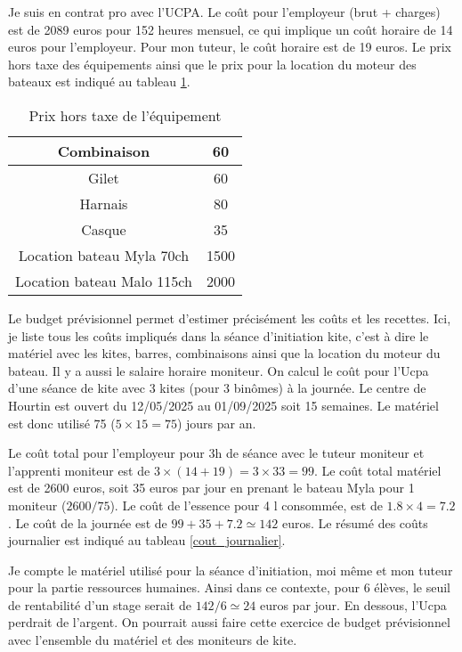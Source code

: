 \documentclass[11pt,a4paper]{report}
\begin{document}
Je suis en contrat pro avec l'UCPA. Le coût pour l'employeur (brut + charges) est
de 2089 euros pour 152 heures mensuel, 
ce qui implique un coût horaire de 14 euros pour l'employeur.
Pour mon tuteur, le coût horaire est de 19 euros.
Le prix hors taxe des équipements ainsi
que le prix pour la location du moteur des bateaux est indiqué
au tableau \ref{cout_equipement}.


\begin{table}[h]
\begin{centering}
\begin{tabular}{|c|c|}
\hline
Combinaison & 60 \\
\hline
Gilet   & 60   \\
Harnais  & 80 \\
\hline
Casque     & 35 \\
\hline
Location bateau Myla 70ch  &  1500 \\
\hline 
Location bateau Malo 115ch & 2000 \\
\hline
\end{tabular}
\caption{Prix hors taxe de l'équipement\label{cout_equipement}}
\end{centering}
\end{table}
Le budget prévisionnel permet d'estimer précisément les co\^uts et les recettes.
Ici, je liste tous les coûts impliqués dans la séance d’initiation kite, 
c'est  à dire le matériel avec les kites, barres, combinaisons ainsi que
la location du moteur du bateau. Il y a aussi le salaire horaire moniteur. 
On calcul le coût pour l'Ucpa
d'une séance de kite avec 3 kites (pour 3 binômes) à la journée.
Le centre de Hourtin est ouvert du 12/05/2025 au 01/09/2025 soit 15 semaines.
Le matériel est donc utilisé 75 ($5\times15=75$) jours par an.

Le coût total pour l'employeur pour 3h de séance avec le tuteur moniteur
et l'apprenti moniteur est de $3\times(14+19) = 3\times33 = 99 $.
Le coût total matériel est de 2600 euros, soit 35 euros par jour  en prenant le bateau Myla pour 1 moniteur ($2600/75$).
Le coût de l'essence pour 4 l consommée, est de $1.8\times4 = 7.2$ .
Le coût de la journée est de $99 + 35 + 7.2 \simeq  142 $ euros.
Le résumé des coûts journalier est indiqué au tableau \ref{cout_journalier}.

Je compte le matériel utilisé pour la séance d’initiation,
moi m\^eme et mon tuteur pour la partie ressources humaines.
Ainsi dans ce contexte,  pour 6 élèves, le seuil de rentabilité
d'un stage serait de $142/6 \simeq 24$ euros
par jour. En dessous, l'Ucpa perdrait de l'argent.
On pourrait aussi faire cette exercice de budget prévisionnel avec
l'ensemble du matériel et des moniteurs de kite.
\end{document}
